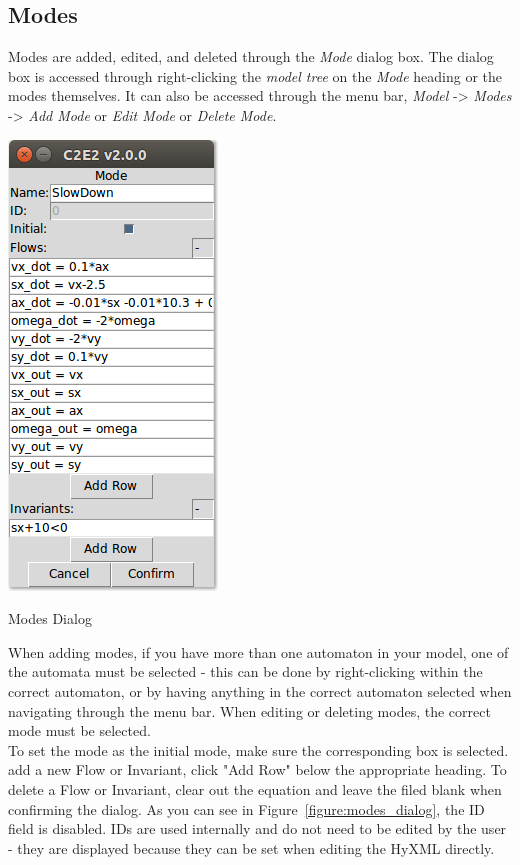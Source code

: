 \documentclass{tufte-book} %
\begin{document}
\subsection{Modes}
Modes are added, edited, and deleted through the \emph{Mode} dialog box. The dialog box is accessed through right-clicking the \emph{model tree} on the \emph{Mode} heading or the modes themselves. It can also be accessed through the menu bar, \emph{Model} -> \emph{Modes} -> \emph{Add Mode} or \emph{Edit Mode} or \emph{Delete Mode}.
\begin{marginfigure}
 \centerline{\includegraphics[scale=.25,keepaspectratio=true]{ManualImages/C2E2_version2.0/mode-dialog.png}}
 \caption{Modes Dialog} 
  \label{figure:modes_dialog}
\end{marginfigure}
When adding modes, if you have more than one automaton in your model, one of the automata must be selected - this can be done by right-clicking within the correct automaton, or by having anything in the correct automaton selected when navigating through the menu bar. When editing or deleting modes, the correct mode must be selected. \\
To set the mode as the initial mode, make sure the corresponding box is selected. add a new Flow or Invariant, click "Add Row" below the appropriate heading. To delete a Flow or Invariant, clear out the equation and leave the filed blank when confirming the dialog. As you can see in Figure~\ref{figure:modes_dialog}, the ID field is disabled. IDs are used internally and do not need to be edited by the user - they are displayed because they can be set when editing the HyXML directly. 
\end{document}
